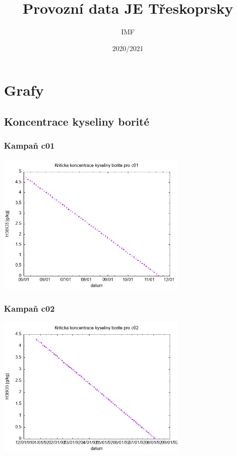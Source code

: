 \documentclass[a4paper,twoside,11pt]{article}
\title{Provozní data JE Třeskoprsky}
\author{IMF}
\date{2020/2021}
\begin{document}
    \maketitle
    \tableofcontents
  
\section{Grafy}
\subsection{Koncentrace kyseliny borité}
\subsubsection{Kampaň c01}

\includegraphics[width=0.7\textwidth]{../plots/bc_c01}

\subsubsection{Kampaň c02}

\includegraphics[width=0.7\textwidth]{../plots/bc_c02}
\end{document}
